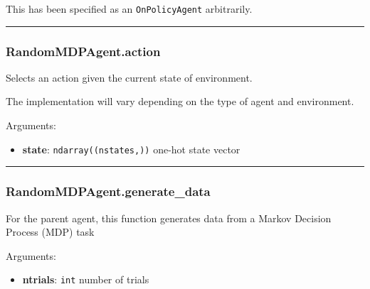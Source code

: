 This has been specified as an \texttt{OnPolicyAgent} arbitrarily.

\begin{center}\rule{0.5\linewidth}{\linethickness}\end{center}

\subsubsection{RandomMDPAgent.action}\label{randommdpagent.action}

\begin{Shaded}
\begin{Highlighting}[]
\end{Highlighting}
\end{Shaded}

Selects an action given the current state of environment.

The implementation will vary depending on the type of agent and
environment.

Arguments:

\begin{itemize}
\tightlist
\item
  \textbf{state}: \texttt{ndarray((nstates,))} one-hot state vector
\end{itemize}

\begin{center}\rule{0.5\linewidth}{\linethickness}\end{center}

\subsubsection{RandomMDPAgent.generate\_data}\label{randommdpagent.generate_data}

\begin{Shaded}
\begin{Highlighting}[]
\end{Highlighting}
\end{Shaded}

For the parent agent, this function generates data from a Markov
Decision Process (MDP) task

Arguments:

\begin{itemize}
\tightlist
\item
  \textbf{ntrials}: \texttt{int} number of trials
\end{itemize}

